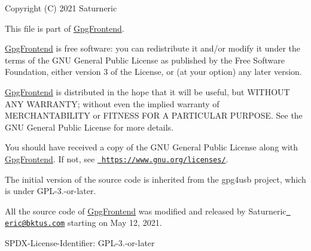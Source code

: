 Copyright (C) 2021 Saturneric

This file is part of \mbox{\hyperlink{namespaceGpgFrontend}{Gpg\+Frontend}}.

\mbox{\hyperlink{namespaceGpgFrontend}{Gpg\+Frontend}} is free software\+: you can redistribute it and/or modify it under the terms of the G\+NU General Public License as published by the Free Software Foundation, either version 3 of the License, or (at your option) any later version.

\mbox{\hyperlink{namespaceGpgFrontend}{Gpg\+Frontend}} is distributed in the hope that it will be useful, but W\+I\+T\+H\+O\+UT A\+NY W\+A\+R\+R\+A\+N\+TY; without even the implied warranty of M\+E\+R\+C\+H\+A\+N\+T\+A\+B\+I\+L\+I\+TY or F\+I\+T\+N\+E\+SS F\+OR A P\+A\+R\+T\+I\+C\+U\+L\+AR P\+U\+R\+P\+O\+SE. See the G\+NU General Public License for more details.

You should have received a copy of the G\+NU General Public License along with \mbox{\hyperlink{namespaceGpgFrontend}{Gpg\+Frontend}}. If not, see \href{https://www.gnu.org/licenses/}{\texttt{ https\+://www.\+gnu.\+org/licenses/}}.

The initial version of the source code is inherited from the gpg4usb project, which is under G\+P\+L-\/3.-\/or-\/later.

All the source code of \mbox{\hyperlink{namespaceGpgFrontend}{Gpg\+Frontend}} was modified and released by Saturneric\href{mailto:eric@bktus.com}{\texttt{ eric@bktus.\+com}} starting on May 12, 2021.

S\+P\+D\+X-\/\+License-\/\+Identifier\+: G\+P\+L-\/3.-\/or-\/later 